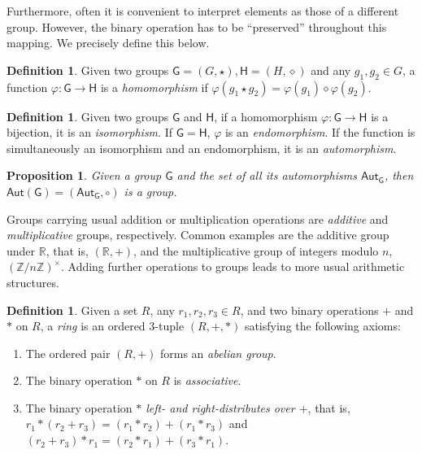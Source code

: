 \documentclass[12pt, a4paper, oneside]{memoir}
\newtheorem{proposition}[theorem]{Proposition}
\theoremstyle{definition}
\newtheorem{definition}[theorem]{Definition}
\begin{document}
Furthermore, often it is convenient to interpret elements as those of a different group. However, the binary operation has to be ``preserved'' throughout this mapping. We precisely define this below.

\begin{definition}\label{def:group-hom}
  Given two groups $\mathsf{G} = (G, \star), \mathsf{H} = (H, \diamond)$ and any $g_{1}, g_{2} \in G$, a function $\varphi : \mathsf{G} \to \mathsf{H}$ is a \emph{homomorphism} if $\varphi(g_{1} \star g_{2}) = \varphi(g_{1}) \diamond \varphi(g_{2})$.
\end{definition}

\begin{definition}\label{def:group-iso}
  Given two groups $\mathsf{G}$ and $\mathsf{H}$, if a homomorphism $\varphi : \mathsf{G} \to \mathsf{H}$ is a bijection, it is an \emph{isomorphism}. If $\mathsf{G} = \mathsf{H}$, $\varphi$ is an \emph{endomorphism}. If the function is simultaneously an isomorphism and an endomorphism, it is an \emph{automorphism}.
\end{definition}

\begin{proposition}\label{prop:group-aut}
  Given a group $\mathsf{G}$ and the set of all its automorphisms $\mathsf{Aut}_{\mathsf{G}}$, then $\mathsf{Aut}(\mathsf{G}) = (\mathsf{Aut}_{\mathsf{G}}, \circ)$ is a group.
\end{proposition}

Groups carrying usual addition or multiplication operations are \emph{additive} and \emph{multiplicative} groups, respectively. Common examples are the additive group under $\mathbb{R}$, that is, $(\mathbb{R}, +)$, and the multiplicative group of integers modulo $n$, $(\mathbb{Z}/n\mathbb{Z})^{\times}$. Adding further operations to groups leads to more usual arithmetic structures.

\begin{definition}
  Given a set $R$, any $r_{1}, r_{2}, r_{3} \in R$, and two binary operations $+$ and $\ast$ on $R$, a \emph{ring} is an ordered $3$-tuple $(R, +, \ast)$ satisfying the following axioms:

  \begin{enumerate}
    \item The ordered pair $(R, +)$ forms an \emph{abelian group}.
    \item The binary operation $\ast$ on $R$ is \emph{associative}.
    \item The binary operation \emph{$\ast$ left- and right-distributes over $+$}, that is, $r_{1} \ast (r_{2} + r_{3}) = (r_{1} \ast r_{2}) + (r_{1} \ast r_{3})$ and $(r_{2} + r_{3}) \ast r_{1} = (r_{2} \ast r_{1}) + (r_{3} \ast r_{1})$.
  \end{enumerate}
\end{definition}
\end{document}
